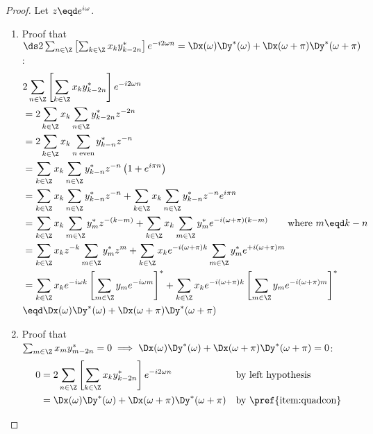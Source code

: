 \begin{proof}
Let $z\eqd e^{i\omega}$.
\begin{enumerate}
\item Proof that
  $\ds
  2\sum_{n\in\Z} \left[ \sum_{k\in\Z}x_k y^\ast_{k-2n} \right] e^{-i2\omega n}
    = \Dx(\omega) \Dy^\ast(\omega) + \Dx(\omega+\pi) \Dy^\ast(\omega+\pi)
    \label{item:quadcon}
  $:
\begin{align*}
  &2\sum_{n\in\Z} \left[ \sum_{k\in\Z}x_k y^\ast_{k-2n} \right] e^{-i2\omega n}
  \\&= 2\sum_{k\in\Z}x_k \sum_{n\in\Z} y^\ast_{k-2n} z^{-2n} %
  \\&= 2\sum_{k\in\Z}x_k \sum_{n\mathrm{\;even}} y^\ast_{k-n} z^{-n} %
  \\&= \sum_{k\in\Z}x_k \sum_{n\in\Z} y^\ast_{k-n} z^{-n} %
       \left( 1 + e^{i\pi n} \right)
  \\&= \sum_{k\in\Z}x_k \sum_{n\in\Z} y^\ast_{k-n} z^{-n} %
     + \sum_{k\in\Z}x_k \sum_{n\in\Z} y^\ast_{k-n} z^{-n}  e^{i\pi n}
  \\&= \sum_{k\in\Z}x_k \sum_{m\in\Z} y^\ast_m z^{-(k-m)} %
     + \sum_{k\in\Z}x_k \sum_{m\in\Z} y^\ast_m e^{-i\left(\omega+\pi\right)(k-m)} 
     \qquad\text{where $m\eqd k-n$}%
  \\&= \sum_{k\in\Z}x_k z^{-k} \sum_{m\in\Z} y^\ast_m z^m %
     + \sum_{k\in\Z}x_k e^{-i\left(\omega+\pi\right)k} \sum_{m\in\Z} y^\ast_m e^{+i\left(\omega+\pi\right)m} 
  \\&= \sum_{k\in\Z}x_k e^{-i\omega k} 
       \left[\sum_{m\in\Z} y_m e^{-i\omega m} \right]^\ast
     + \sum_{k\in\Z}x_k e^{-i\left(\omega+\pi\right)k} 
       \left[\sum_{m\in\Z} y_m e^{-i\left(\omega+\pi\right)m} \right]^\ast
  \\&\eqd \Dx(\omega) \Dy^\ast(\omega)
     + \Dx(\omega+\pi) \Dy^\ast(\omega+\pi)
\end{align*}

\item Proof that
  $\sum_{m\in\Z} x_m y^\ast_{m-2n} = 0
   \implies
   \Dx(\omega) \Dy^\ast(\omega) + \Dx(\omega+\pi) \Dy^\ast(\omega+\pi)=0
  $: 
\begin{align*}
  0 
    &= 2\sum_{n\in\Z} \left[ \sum_{k\in\Z}x_k y^\ast_{k-2n} \right] e^{-i2\omega n}
    && \text{by left hypothesis}
  \\&= \Dx(\omega) \Dy^\ast(\omega)
      +\Dx(\omega+\pi) \Dy^\ast(\omega+\pi)
    && \text{by \pref{item:quadcon}}
\end{align*}



\end{enumerate}
\end{proof}
